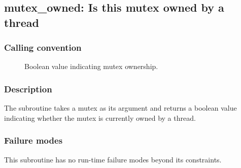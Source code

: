 \clearpage
{}
{}
\label{subr:mutex_owned}
\subsection*{mutex\_owned: Is this mutex owned by a thread}

\subsubsection*{Calling convention}

\begin{description}
\item[] Boolean value indicating mutex ownership.
\end{description}

\subsubsection*{Description}

The  subroutine takes a mutex as its argument
and returns a boolean value indicating whether the mutex is currently
owned by a thread.

\subsubsection*{Failure modes}

This subroutine has no run-time failure modes beyond its constraints.
